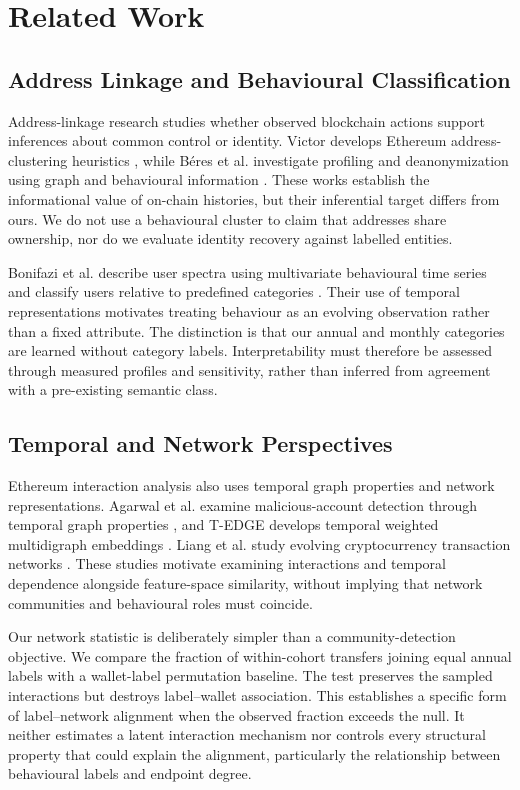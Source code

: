 \section{Related Work}
\subsection{Address Linkage and Behavioural Classification}
Address-linkage research studies whether observed blockchain actions support inferences about common control or identity. Victor develops Ethereum address-clustering heuristics \cite{victor2020address}, while B\'{e}res et al. investigate profiling and deanonymization using graph and behavioural information \cite{beres2021blockchain}. These works establish the informational value of on-chain histories, but their inferential target differs from ours. We do not use a behavioural cluster to claim that addresses share ownership, nor do we evaluate identity recovery against labelled entities.

Bonifazi et al. describe user spectra using multivariate behavioural time series and classify users relative to predefined categories \cite{bonifazi2022userspectra}. Their use of temporal representations motivates treating behaviour as an evolving observation rather than a fixed attribute. The distinction is that our annual and monthly categories are learned without category labels. Interpretability must therefore be assessed through measured profiles and sensitivity, rather than inferred from agreement with a pre-existing semantic class.

\subsection{Temporal and Network Perspectives}
Ethereum interaction analysis also uses temporal graph properties and network representations. Agarwal et al. examine malicious-account detection through temporal graph properties \cite{agarwal2021temporal}, and T-EDGE develops temporal weighted multidigraph embeddings \cite{tedge2020}. Liang et al. study evolving cryptocurrency transaction networks \cite{liang2018evolutionary}. These studies motivate examining interactions and temporal dependence alongside feature-space similarity, without implying that network communities and behavioural roles must coincide.

Our network statistic is deliberately simpler than a community-detection objective. We compare the fraction of within-cohort transfers joining equal annual labels with a wallet-label permutation baseline. The test preserves the sampled interactions but destroys label--wallet association. This establishes a specific form of label--network alignment when the observed fraction exceeds the null. It neither estimates a latent interaction mechanism nor controls every structural property that could explain the alignment, particularly the relationship between behavioural labels and endpoint degree.


